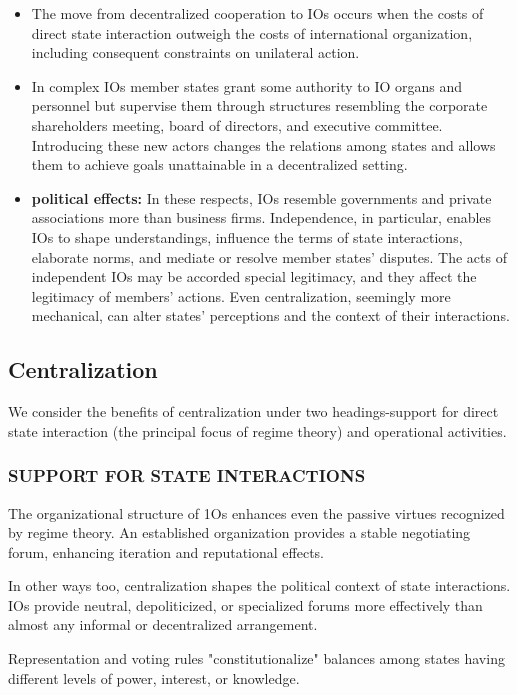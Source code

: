 \begin{itemize}
    \item The move from decentralized cooperation to IOs occurs when the costs of direct state interaction outweigh the costs of international organization, including consequent constraints on unilateral action.
    \item In complex IOs member states grant some authority to IO organs and personnel but supervise them through structures resembling the corporate shareholders meeting, board of directors, and executive committee. Introducing these new actors changes the relations among states and allows them to achieve goals unattainable in a decentralized setting.
    \item \textbf{political effects:} In these respects, IOs resemble governments and private associations more than business firms. Independence, in particular, enables IOs to shape understandings, influence the terms of state interactions, elaborate norms, and mediate or resolve member states' disputes. The acts of independent IOs may be accorded special legitimacy, and they affect the legitimacy of members' actions. Even centralization, seemingly more mechanical, can alter states' perceptions and the context of their interactions.
\end{itemize}


\subsection{Centralization}
We consider the benefits of centralization under two headings-support for direct state interaction (the principal focus of regime theory) and operational activities.

\subsubsection{SUPPORT FOR STATE INTERACTIONS}
The organizational structure of 1Os enhances even the passive virtues recognized by regime theory. An established organization provides a stable negotiating forum, enhancing iteration and reputational effects.

In other ways too, centralization shapes the political context of state interactions. IOs provide neutral, depoliticized, or specialized forums more effectively than almost any informal or decentralized arrangement.

Representation and voting rules "constitutionalize" balances among states having different levels of power, interest, or knowledge.

